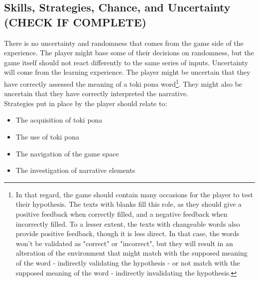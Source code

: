 \documentclass{scrartcl}
\begin{document}
		\subsection{Skills, Strategies, Chance, and Uncertainty (CHECK IF COMPLETE)}
			There is no uncertainty and randomness that comes from the game side of the experience. The player might base some of their decisions on randomness, but the game itself should not react differently to the same series of inputs. Uncertainty will come from the learning experience. The player might be uncertain that they have correctly assessed the meaning of a toki pona word\footnote{In that regard, the game should contain many occasions for the player to test their hypothesis. The texts with blanks  fill this role, as they should give a positive feedback when correctly filled, and a negative feedback when incorrectly filled. To a lesser extent, the texts with changeable words also provide positive feedback, though it is less direct. In that case, the words won't be validated as "correct" or "incorrect", but they will result in an alteration of the environment that might match with the supposed meaning of the word - indirectly validating the hypothesis - or not match with the supposed meaning of the word - indirectly invalidating the hypothesis.}. They might also be uncertain that they have correctly interpreted the narrative. \\ 
			Strategies put in place by the player should relate to:
			\begin{itemize}
				\item The acquisition of toki pona
				\item The use of toki pona
				\item The navigation of the game space
				\item The investigation of narrative elements
			\end{itemize}		
\end{document}
